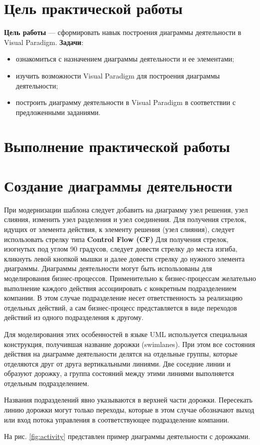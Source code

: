 \graphicspath{{./fifth/img/}} %

\section*{\LARGE Цель практической работы}

\textbf{Цель работы} --- сформировать навык построения диаграммы
деятельности в Visual Paradigm.
\textbf{Задачи}:
\begin{itemize}
	\item ознакомиться с назначением диаграммы деятельности и ее элементами;
	\item изучить возможности Visual Paradigm для построения
		диаграммы деятельности;
	\item построить диаграмму деятельности в Visual Paradigm
		в соответствии с предложенными заданиями.
\end{itemize}

\clearpage

\section*{\LARGE Выполнение практической работы}
\section{Создание диаграммы деятельности}
При модернизации шаблона следует добавить на диаграмму узел решения,
узел слияния, изменить узел разделения и узел соединения. Для получения
стрелок, идущих от элемента действия, к элементу решения (узел слияния),
следует использовать стрелку типа \textbf{Control Flow (CF)} Для получения
стрелок, изогнутых под углом 90 градусов, следует довести стрелку до места
изгиба, кликнуть левой кнопкой мышки и далее довести стрелку до нужного
элемента диаграммы. Диаграммы деятельности могут быть использованы для
моделирования бизнес-процессов. Применительно к бизнес-процессам
желательно выполнение каждого действия ассоциировать с конкретным
подразделением компании. В этом случае подразделение несет ответственность
за реализацию отдельных действий, а сам бизнес-процесс представляется в виде
переходов действий из одного подразделения к другому.\par
Для моделирования этих особенностей в языке UML используется
специальная конструкция, получившая название дорожки (swimlanes). При этом
все состояния действия на диаграмме деятельности делятся на отдельные
группы, которые отделяются друг от друга вертикальными линиями. Две
соседние линии и образуют дорожку, а группа состояний между этими линиями
выполняется отдельным подразделением.\par
Названия подразделений явно указываются в верхней части дорожки.
Пересекать линию дорожки могут только переходы, которые в этом случае
обозначают выход или вход потока управления в соответствующее
подразделение компании.\par
На рис. \ref{fig:activity} представлен пример диаграммы деятельности
с дорожками.

